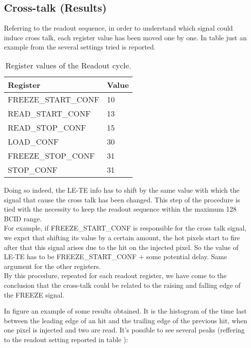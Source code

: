 \subsection{Cross-talk (Results)}

Referring to the readout sequence, in order to understand which signal could induce cross talk, each register value has been moved one by one.
In table  just an example from the several settings tried is reported.

\begin{table}[h!]
\centering
\begin{tabular}{>{} C{5cm}|C{1.7cm}}
Register & Value \\
\hline
\textsc{FREEZE\_START\_CONF} & 10\\[0.3ex]
\hline
\textsc{READ\_START\_CONF}& 13 \\[0.3ex]
\hline
\textsc{READ\_STOP\_CONF} & 15 \\[0.3ex]
\hline
\textsc{LOAD\_CONF} & 30 \\[0.3ex]
\hline
\textsc{FREEZE\_STOP\_CONF} & 31\\[0.3ex]
\hline
\textsc{STOP\_CONF} & 31\\[0.3ex]
\hline
\end{tabular}
\caption{Register values of the Readout cycle.}
\label{tab:ro_registers}
\end{table}

Doing so indeed, the LE-TE info has to shift by the same value with which the signal that cause the cross talk has been changed. This step of the procedure is tied with the necessity to keep the readout sequence within the maximum 128 BCID range.\\

For example, if \textsc{FREEZE\_START\_CONF} is responsible for the cross talk signal, we expct that shifting its value by a certain amount, the hot pixels start to fire after that this signal arises due to the hit on the injected pixel. So the value of LE-TE has to be \textsc{FREEZE\_START\_CONF} + some potential delay. Same argument for the other registers. \\

By this procedure, repeated for each readout register, we have come to the conclusion that the cross-talk could be related to the raising and falling edge of the \textsc{FREEZE} signal.

In figure  an example of some results obtained. It is the histogram of the time last between the leading edge of an hit and the trailing edge of the previous hit, when one pixel is injected and two are read. It's possible to see several peaks (reffering to the readout setting reported in table ):

